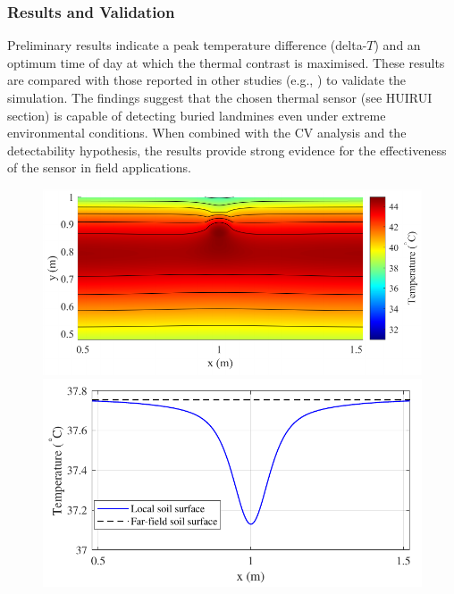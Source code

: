     \subsubsection{Results and Validation}
    Preliminary results indicate a peak temperature difference (delta-\(T\)) and an optimum time of day at which the thermal contrast is maximised. These results are compared with those reported in other studies (e.g., \cite{dummyRef3}) to validate the simulation. The findings suggest that the chosen thermal sensor (see HUIRUI section) is capable of detecting buried landmines even under extreme environmental conditions. When combined with the CV analysis and the detectability hypothesis, the results provide strong evidence for the effectiveness of the sensor in field applications.

    \begin{figure}[htbp]
        \centering
        \begin{minipage}[b]{0.48\textwidth} %
            \includegraphics[width=\textwidth]{figs/Rory/thermal_result.pdf}
        \end{minipage}
        \hfill %
        \begin{minipage}[b]{0.48\textwidth} %
            \includegraphics[width=\textwidth]{figs/Rory/1D_distribution_cropped.pdf}

\end{minipage}
\end{figure}

